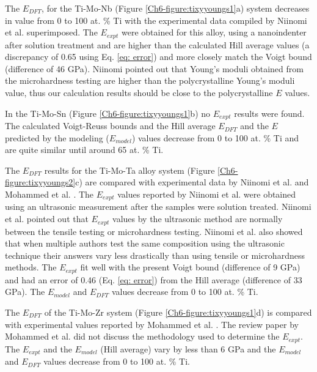 The $E_{DFT}$, for the Ti-Mo-Nb (Figure \ref{Ch6-figure:tixyyoungs1}a) system decreases in value from 0 to 100 at. \% Ti with the experimental data compiled by Niinomi et al. \cite{Niinomi2012} superimposed. The $E_{expt}$ were obtained for this alloy, using a nanoindenter after solution treatment and are higher than the calculated Hill average values (a discrepancy of 0.65 using Eq. \ref{eq: error}) and more closely match the Voigt bound (difference of 46 GPa). Niinomi \cite{Niinomi2012} pointed out that Young's moduli obtained from the microhardness testing are higher than the polycrystalline Young's moduli value, thus our calculation results should be close to the polycrystalline $E$ values. 

In the Ti-Mo-Sn (Figure \ref{Ch6-figure:tixyyoungs1}b) no $E_{expt}$ results were found. The calculated Voigt-Reuss bounds and the Hill average $E_{DFT}$ and the $E$ predicted by the modeling ($E_{model}$) values decrease from 0 to 100 at. \% Ti and are quite similar until around 65 at. \% Ti.

The $E_{DFT}$ results for the Ti-Mo-Ta alloy system (Figure \ref{Ch6-figure:tixyyoungs2}c) are compared with experimental data by Niinomi et al. \cite{Niinomi2012} and Mohammed et al. \cite{Mohammed2014}. The $E_{expt}$ values reported by Niinomi et al. \cite{Niinomi2012} were obtained using an ultrasonic measurement after the samples were solution treated. Niinomi et al. \cite{Niinomi2012} pointed out that $E_{expt}$ values by the ultrasonic method are normally between the tensile testing or microhardness testing. Niinomi et al. \cite{Niinomi2012} also showed that when multiple authors test the same composition using the ultrasonic technique their answers vary less drastically than using tensile or microhardness methods. The $E_{expt}$ fit well with the present Voigt bound (difference of 9 GPa) and had an error of 0.46 (Eq. \ref{eq: error}) from the Hill average (difference of 33 GPa). The $E_{model}$ and $E_{DFT}$ values decrease from 0 to 100 at. \% Ti. 

The $E_{DFT}$ of the Ti-Mo-Zr system (Figure \ref{Ch6-figure:tixyyoungs1}d) is compared with experimental values reported by Mohammed et al. \cite{Mohammed2014}. The review paper by Mohammed et al. \cite{Mohammed2014} did not discuss the methodology used to determine the $E_{expt}$. The $E_{expt}$  \cite{Mohammed2014} and the $E_{model}$ (Hill average) vary by less than 6 GPa and the $E_{model}$ and $E_{DFT}$ values decrease from 0 to 100 at. \% Ti. 

